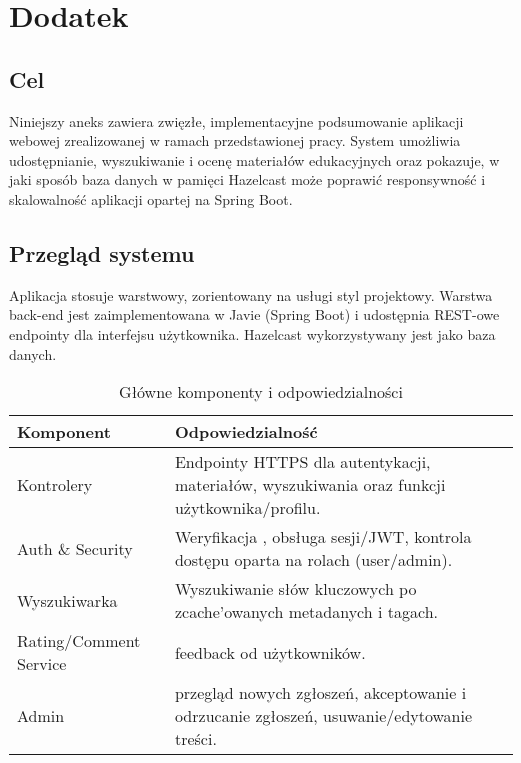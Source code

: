 %
\thispagestyle{empty}
\listoffigures

\chapter{Dodatek}
\label{chapter:dodatek_A}

\section*{Cel}
Niniejszy aneks zawiera zwięzłe, implementacyjne podsumowanie aplikacji webowej zrealizowanej w ramach przedstawionej pracy. System umożliwia udostępnianie, wyszukiwanie i ocenę materiałów edukacyjnych oraz pokazuje, w jaki sposób baza danych w pamięci Hazelcast może poprawić responsywność i skalowalność aplikacji opartej na Spring Boot.

\section*{Przegląd systemu}
Aplikacja stosuje warstwowy, zorientowany na usługi styl projektowy. Warstwa back-end jest zaimplementowana w Javie (Spring Boot) i udostępnia REST-owe endpointy dla interfejsu użytkownika. Hazelcast wykorzystywany jest jako baza danych.

\begin{table}[h]
  \centering
  \caption{Główne komponenty i odpowiedzialności}
  \label{tab:components}
  \begin{tabular}{@{}p{3.3cm}p{9.2cm}@{}}
  \toprule
  Komponent & Odpowiedzialność \\
  \midrule
  Kontrolery & Endpointy HTTPS dla autentykacji, materiałów, wyszukiwania oraz funkcji użytkownika/profilu. \\
  Auth \& Security & Weryfikacja , obsługa sesji/JWT, kontrola dostępu oparta na rolach (user/admin). \\
  Wyszukiwarka & Wyszukiwanie słów kluczowych po zcache'owanych metadanych i tagach. \\
  Rating/Comment Service & feedback od użytkowników. \\
  Admin & przegląd nowych zgłoszeń, akceptowanie i odrzucanie zgłoszeń, usuwanie/edytowanie treści. \\
  \bottomrule
  \end{tabular}
\end{table}


